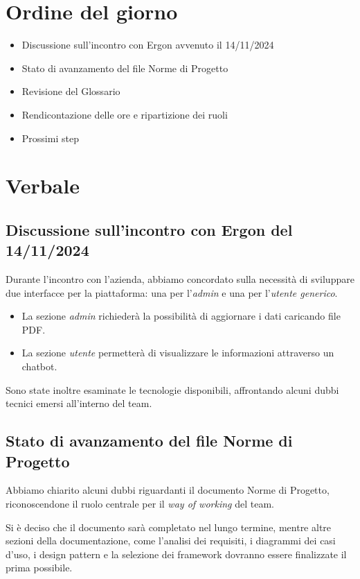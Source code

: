 \documentclass{article}
\begin{document}
\section{Ordine del giorno}
\begin{itemize} 
    \item Discussione sull'incontro con Ergon avvenuto il 14/11/2024 
    \item Stato di avanzamento del file Norme di Progetto 
    \item Revisione del Glossario 
    \item Rendicontazione delle ore e ripartizione dei ruoli 
    \item Prossimi step 
\end{itemize}

\newpage
\section{Verbale}
\subsection{Discussione sull'incontro con Ergon del 14/11/2024} 
Durante l'incontro con l'azienda, abbiamo concordato sulla necessità di sviluppare due interfacce per la piattaforma: una per l'\textit{admin} e una per l'\textit{utente generico}.
\begin{itemize}
    \item La sezione \textit{admin} richiederà la possibilità di aggiornare i dati caricando file PDF.
    \item La sezione \textit{utente} permetterà di visualizzare le informazioni attraverso un chatbot.
\end{itemize}
Sono state inoltre esaminate le tecnologie disponibili, affrontando alcuni dubbi tecnici emersi all'interno del team.

\subsection{Stato di avanzamento del file Norme di Progetto} 
Abbiamo chiarito alcuni dubbi riguardanti il documento Norme di Progetto, riconoscendone il ruolo centrale per il \textit{way of working} del team.

Si è deciso che il documento sarà completato nel lungo termine, mentre altre sezioni della documentazione, come l'analisi dei requisiti, i diagrammi dei casi d'uso, i design pattern e la selezione dei framework dovranno essere finalizzate il prima possibile.
\end{document}
